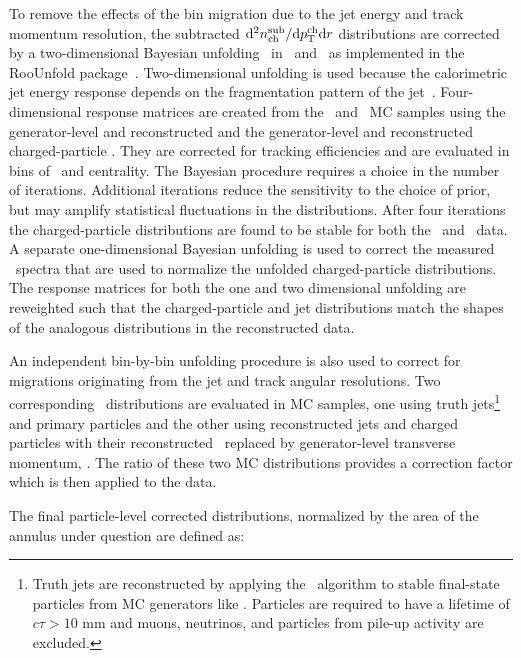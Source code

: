 
To remove the effects of the bin migration due to the jet energy and track momentum resolution, the subtracted $\mathrm{d}^2 \mbox{$n_{\mathrm{ch}}^{\mathrm{sub}}$} /\mathrm{d}\mbox{$p_{\mathrm{T}}^{\mathrm{ch}}$} \mathrm{d} r$ distributions are corrected by a two-dimensional Bayesian unfolding~\cite{DAgostini:1994zf}
in \pttrk\ and \ptjet\ as implemented in the RooUnfold package~\cite{Adye:2011gm}.  
Two-dimensional unfolding is used because the calorimetric jet energy response depends on the fragmentation pattern of the jet~\cite{Aad:2011he}.
Four-dimensional response matrices are created from the \pp\ and \pbpb\ MC samples using the generator-level and reconstructed \ptjet and the generator-level and reconstructed charged-particle \pttrk. They are corrected for tracking efficiencies and are evaluated in bins of \rvar\ and centrality. The Bayesian procedure requires a choice in the number of iterations.
Additional iterations reduce the sensitivity to the choice of prior, but may
amplify statistical fluctuations in the distributions.
After four iterations the 
charged-particle distributions are found to be stable for both the \PbPb\ and \pp\ data.
A separate one-dimensional Bayesian unfolding is used to correct the measured \ptjet\ spectra that are used to normalize the unfolded charged-particle distributions.
The response matrices for both the one and two dimensional unfolding are reweighted such that the charged-particle and jet distributions match the shapes 
of the analogous distributions in the reconstructed data.

An independent bin-by-bin unfolding procedure is also used to correct for migrations originating from
the jet and track angular resolutions. Two corresponding \Dptr\ distributions are evaluated in MC
samples, one using truth jets\footnote{Truth jets are reconstructed by applying the \antikt\ algorithm to stable final-state particles from MC generators like \PYTHIA. Particles are required to have a lifetime of $c\tau > 10$ mm and muons, neutrinos, and particles from pile-up activity are excluded.} and
primary particles and the other using reconstructed jets and charged particles with their
reconstructed \pt\ replaced by generator-level transverse momentum, \pTtrue. The ratio of
these two MC distributions provides a correction factor which is then applied to the data. 

The final particle-level corrected distributions, normalized by the area of the annulus under question are defined as:

